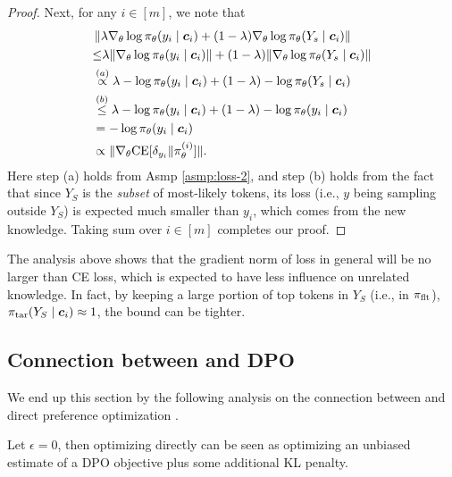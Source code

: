 \begin{proof}
Next, for any $i \in [m]$, 
we note that 
\begin{align*}
&
\left \| \lambda \nabla_\theta \log \pil(y_i \mid \cv_i) + 
(1-\lambda) \nabla_\theta \log \pil (Y_s \mid \cv_i) \right \|  \\
&{\leq} 
\lambda \| \nabla_\theta \log \pil(y_i \mid \cv_i) \| + 
(1 - \lambda) \| \nabla_\theta \log \pil (Y_s \mid \cv_i) \|  \\
&\overset{(a)}{\propto} 
\lambda -\log \pil(y_i \mid \cv_i) + 
(1 - \lambda) - \log \pil (Y_s \mid \cv_i) \\
&\overset{(b)}{\leq} 
\lambda -\log \pil(y_i \mid \cv_i) + ( 1 - \lambda) - \log \pil(y_i \mid \cv_i) \\
&= 
-\log \pil(y_i \mid \cv_i) \\
&\propto 
\| \nabla_\theta \ce[\de{y_i}{} \| \pil^{(i)} ]\|. 
\end{align*}
% 
Here step (a) holds from Asmp \ref{asmp:loss-2},
and step (b) holds from the fact that since $Y_S$ is the \textit{subset} of most-likely tokens, its loss (i.e., $y$ being sampling outside $Y_S$) is expected much smaller than $y_i$, which comes from the new knowledge.
Taking sum over $i \in [m]$ completes our proof. 
\end{proof}

The analysis above shows that the gradient norm of {\NAME} loss in general will be no larger than CE loss, which is expected to have less influence on unrelated knowledge. 
In fact, by keeping a large portion of top tokens in $Y_S$ (i.e., in $\pi_\text{flt}$), $\pi_\text{tar}(Y_S \mid {\boldsymbol{c}}_i) \approx 1$, the bound can be tighter. 
\fi


\subsection{Connection between {\NAME} and DPO}

We end up this section by the following analysis on the connection between {\NAME} and direct preference optimization \citep{rafailov2024direct}.

\begin{theorem}
Let $\epsilon = 0$, 
then optimizing {\NAME} directly can be seen as optimizing an unbiased estimate of a DPO objective plus some additional KL penalty. 
\end{theorem}



